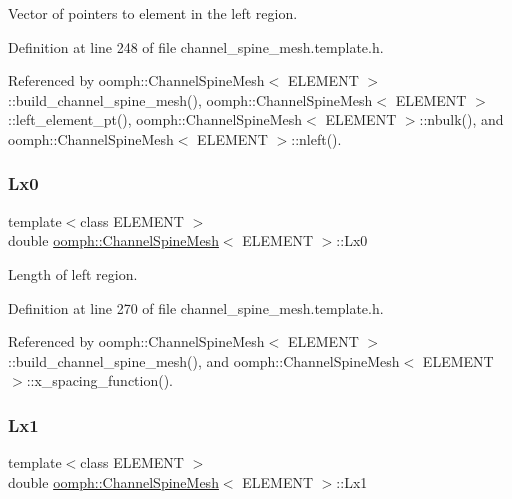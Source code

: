 Vector of pointers to element in the left region. 



Definition at line 248 of file channel\+\_\+spine\+\_\+mesh.\+template.\+h.



Referenced by oomph\+::\+Channel\+Spine\+Mesh$<$ E\+L\+E\+M\+E\+N\+T $>$\+::build\+\_\+channel\+\_\+spine\+\_\+mesh(), oomph\+::\+Channel\+Spine\+Mesh$<$ E\+L\+E\+M\+E\+N\+T $>$\+::left\+\_\+element\+\_\+pt(), oomph\+::\+Channel\+Spine\+Mesh$<$ E\+L\+E\+M\+E\+N\+T $>$\+::nbulk(), and oomph\+::\+Channel\+Spine\+Mesh$<$ E\+L\+E\+M\+E\+N\+T $>$\+::nleft().

\mbox{\label{classoomph_1_1ChannelSpineMesh_a3d61af363a8da156f4fe6d10e62f73c6}} 
\subsubsection{\texorpdfstring{Lx0}{Lx0}}
{\footnotesize\ttfamily template$<$class E\+L\+E\+M\+E\+NT $>$ \\
double \hyperlink{classoomph_1_1ChannelSpineMesh}{oomph\+::\+Channel\+Spine\+Mesh}$<$ E\+L\+E\+M\+E\+NT $>$\+::Lx0\hspace{0.3cm}{\ttfamily [protected]}}



Length of left region. 



Definition at line 270 of file channel\+\_\+spine\+\_\+mesh.\+template.\+h.



Referenced by oomph\+::\+Channel\+Spine\+Mesh$<$ E\+L\+E\+M\+E\+N\+T $>$\+::build\+\_\+channel\+\_\+spine\+\_\+mesh(), and oomph\+::\+Channel\+Spine\+Mesh$<$ E\+L\+E\+M\+E\+N\+T $>$\+::x\+\_\+spacing\+\_\+function().

\mbox{\label{classoomph_1_1ChannelSpineMesh_a35f5d840478b2b93199a393cbdb50f2d}} 
\subsubsection{\texorpdfstring{Lx1}{Lx1}}
{\footnotesize\ttfamily template$<$class E\+L\+E\+M\+E\+NT $>$ \\
double \hyperlink{classoomph_1_1ChannelSpineMesh}{oomph\+::\+Channel\+Spine\+Mesh}$<$ E\+L\+E\+M\+E\+NT $>$\+::Lx1\hspace{0.3cm}{\ttfamily [protected]}}



